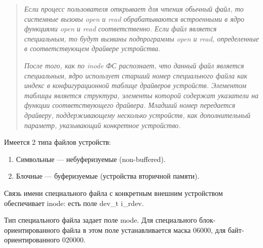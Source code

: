 \begin{quote}
\textit{Если процесс пользователя открывает для чтения обычный файл, то системные вызовы open и read обрабатываются встроенными в ядро функциями open и read соответственно. Если файл является специальным, то будут вызваны подпрограммы open и read, определенные в соответствующем драйвере устройства.}

\textit{После того, как по inode ФС распознает, что данный файл является специальным, ядро использует старший номер специального файла как индекс в конфигурационной таблице драйверов устройств. Элементом таблицы является структура, элементы которой содержат указатели на функции соответствующего драйвера. Младший номер передается драйверу, поддерживающему несколько устройств, как дополнительный параметр, указывающий конкретное устройство.}
\end{quote}

Имеется 2 типа файлов устройств:
\begin{enumerate}
	\item Символьные --- небуферизуемые (non-buffered).
	\item Блочные --- буферизуемые (устройства вторичной памяти).
\end{enumerate}

Связь имени специального файла с конкретным внешним устройством обеспечивает inode: есть поле dev\_t i\_rdev.

Тип специального файла задает поле mode. Для специального блок- ориентированного файла в этом поле устанавливается маска 06000, для байт- ориентированного 020000.

